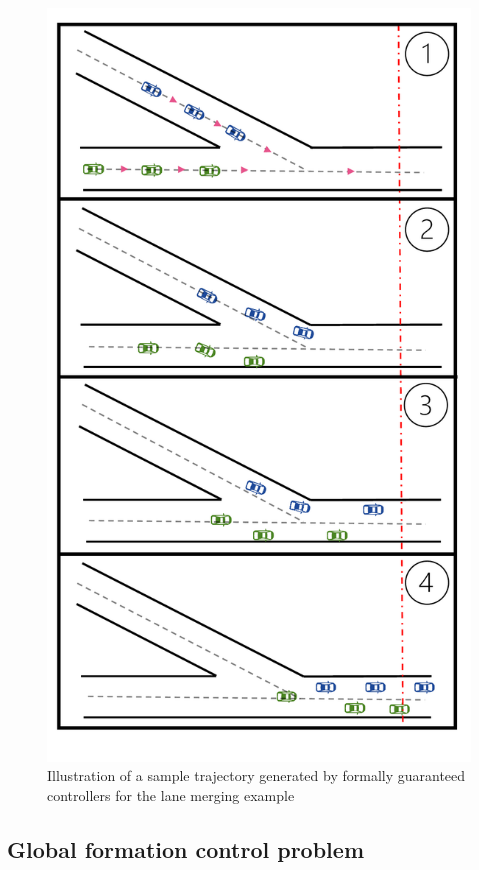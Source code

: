 \begin{figure}
	\centering
	\includegraphics[scale=.21]{figures/merge_updated.pdf}
	\caption{Illustration of a sample trajectory generated by formally guaranteed controllers for the lane merging example}
	\label{fig:merge}
\vspace{-0.4cm}
\end{figure}


\subsection{Global formation control problem}\label{sec:global formation control}

